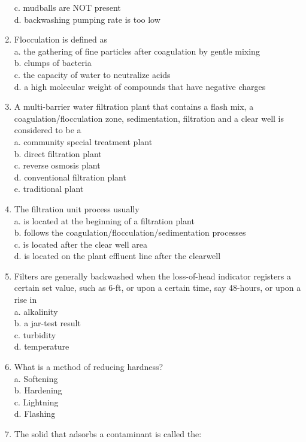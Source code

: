 \begin{enumerate}[1.]
c. mudballs are NOT present\\
d. backwashing pumping rate is too low\\
\item Flocculation is defined as\\
a. the gathering of fine particles after coagulation by gentle mixing\\
b. clumps of bacteria\\
c. the capacity of water to neutralize acids\\
d. a high molecular weight of compounds that have negative charges\\
\item A multi-barrier water filtration plant that contains a flash mix, a coagulation/flocculation zone, sedimentation, filtration and a clear well is considered to be a\\
a. community special treatment plant\\
b. direct filtration plant\\
c. reverse osmosis plant\\
d. conventional filtration plant\\
e. traditional plant\\
\item The filtration unit process usually\\
a. is located at the beginning of a filtration plant\\
b. follows the coagulation/flocculation/sedimentation processes\\
c. is located after the clear well area\\
d. is located on the plant effluent line after the clearwell\\
\item Filters are generally backwashed when the loss-of-head indicator registers a certain set value, such as 6-ft, or upon a certain time, say 48-hours, or upon a rise in\\
a. alkalinity\\
b. a jar-test result\\
c. turbidity\\
d. temperature\\
\item What is a method of reducing hardness?\\
a. Softening\\
b. Hardening\\
c. Lightning\\
d. Flashing\\
\item The solid that adsorbs a contaminant is called the:\\

\end{enumerate}
